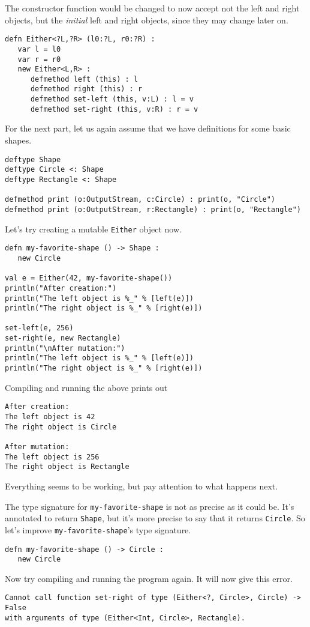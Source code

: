 \documentclass[10pt,oneside]{book}
\begin{document}
The constructor function would be changed to now accept not the left and right objects, but the {\em initial} left and right objects, since they may change later on.
\begin{lstlisting}
defn Either<?L,?R> (l0:?L, r0:?R) :
   var l = l0
   var r = r0
   new Either<L,R> :
      defmethod left (this) : l
      defmethod right (this) : r
      defmethod set-left (this, v:L) : l = v
      defmethod set-right (this, v:R) : r = v
\end{lstlisting}

For the next part, let us again assume that we have definitions for some basic shapes.
\begin{lstlisting}
deftype Shape
deftype Circle <: Shape
deftype Rectangle <: Shape

defmethod print (o:OutputStream, c:Circle) : print(o, "Circle")
defmethod print (o:OutputStream, r:Rectangle) : print(o, "Rectangle")
\end{lstlisting}

Let's try creating a mutable \texttt{\frenchspacing Either} object now.
\begin{lstlisting}
defn my-favorite-shape () -> Shape :
   new Circle

val e = Either(42, my-favorite-shape())
println("After creation:")
println("The left object is %_" % [left(e)])
println("The right object is %_" % [right(e)])

set-left(e, 256)
set-right(e, new Rectangle)
println("\nAfter mutation:")
println("The left object is %_" % [left(e)])
println("The right object is %_" % [right(e)])
\end{lstlisting}
Compiling and running the above prints out
\begin{lstlisting}
After creation:
The left object is 42
The right object is Circle

After mutation:
The left object is 256
The right object is Rectangle
\end{lstlisting}

Everything seems to be working, but pay attention to what happens next. 

The type signature for \texttt{\frenchspacing my-favorite-shape} is not as precise as it could be. It's annotated to return \texttt{\frenchspacing Shape}, but it's more precise to say that it returns \texttt{\frenchspacing Circle}. So let's improve \texttt{\frenchspacing my-favorite-shape}'s type signature.
\begin{lstlisting}
defn my-favorite-shape () -> Circle :
   new Circle
\end{lstlisting}
Now try compiling and running the program again. It will now give this error.
\begin{lstlisting}
Cannot call function set-right of type (Either<?, Circle>, Circle) -> False 
with arguments of type (Either<Int, Circle>, Rectangle).
\end{lstlisting}
\end{document}
